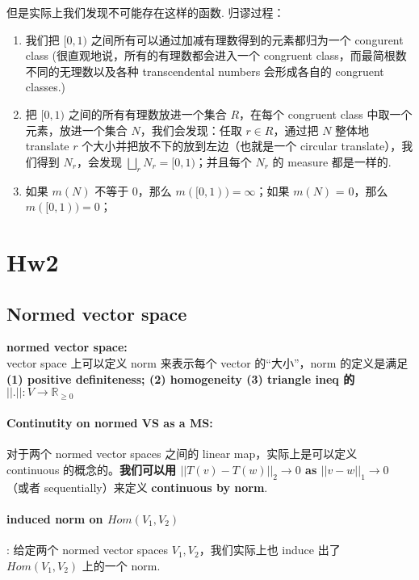 \documentclass[lang=cn,11pt]{elegantbook}
\begin{document}
\noindent 但是实际上我们发现不可能存在这样的函数. 
\noindent 归谬过程：
   \begin{enumerate}
       \item   我们把 $[0,1)$ 之间所有可以通过加减有理数得到的元素都归为一个 congurent class (很直观地说，所有的有理数都会进入一个 congruent class，而最简根数不同的无理数以及各种 transcendental numbers 会形成各自的 congruent classes.)
       \item  把 $[0,1)$ 之间的所有有理数放进一个集合 $R$，在每个 congruent class 中取一个元素，放进一个集合 $N$，我们会发现：任取 $r \in R$，通过把 $N$ 整体地 translate $r$ 个大小并把放不下的放到左边（也就是一个 circular translate），我们得到 $N_r$，会发现 $\bigsqcup_{r} N_r = [0,1)$；并且每个 $N_r$ 的 measure 都是一样的.
       \item   如果 $m(N)$ 不等于 0，那么 $m([0,1)) = \infty$；如果 $m(N)$ = 0，那么 $m([0,1)) = 0$；
   \end{enumerate}

\section*{Hw2}
\subsection{Normed vector space}
\begin{definition}
    \textbf{normed vector space:} 
    \\vector space 上可以定义 norm 来表示每个 vector 的“大小”，norm 的定义是满足 \textbf{(1) positive definiteness; (2) homogeneity (3) triangle ineq 的 $||.||: V \rightarrow \mathbb{R}_{\geq0}$}
\end{definition}

\paragraph{Continutity on normed VS as a MS:} 对于两个 normed vector spaces 之间的 linear map，实际上是可以定义 continuous 的概念的。\textbf{我们可以用 $||T(v) - T(w)||_2 \rightarrow 0$ as $||v - w||_1 \rightarrow 0$} （或者 sequentially）来定义 \textbf{continuous by norm}.

\paragraph{induced norm on $Hom(V_1, V_2)$}: 给定两个 normed vector spaces $V_1, V_2$，我们实际上也 induce 出了 $Hom(V_1, V_2)$ 上的一个 norm. 
\end{document}
